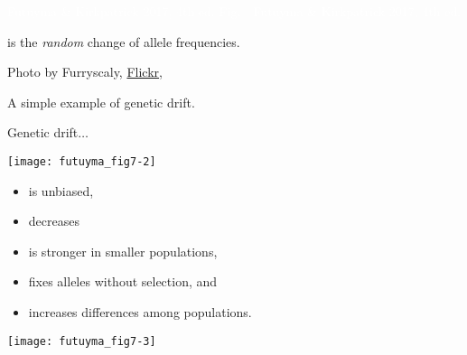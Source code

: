 \documentclass[t]{beamer}
\newcommand{\futuyma}[1]{%
	\ifthenelse{\isempty{#1}}%
	{Futuyma \& Kirkpatrick 2017, 4th ed.}%
	{Fig.~#1~Futuyma \& Kirkpatrick 2017, 4th ed.}%
}
\begin{document}


{
\begin{frame}[b]

\tiny \textcolor{white}{\futuyma{}}
\end{frame}
}


{
\begin{frame}[t]{ is the \emph{random} change of allele frequencies.}

\vfilll

\tiny Photo by Furryscaly, \href{https://www.flickr.com/photos/98528214@N00/428682623}{Flickr}, 
\end{frame}
}

{
\begin{frame}[t]{A simple example of genetic drift.}

\end{frame}
}


\begin{frame}[t]{Genetic drift$\dots$}

\vspace{-\baselineskip}

\begin{multicols}{2}
\noindent\texttt{[image: futuyma\_fig7-2]}

\columnbreak

\begin{itemize}[label=\textcolor{white}{\textbullet}, leftmargin=6pt]
\item is unbiased,
\item decreases 
\item is stronger in smaller populations,
\item fixes alleles without selection, and
\item increases differences among populations.
\end{itemize}

\end{multicols}

\end{frame}



\begin{frame}
\centering

\texttt{[image: futuyma\_fig7-3]}
\end{frame}
\end{document}
